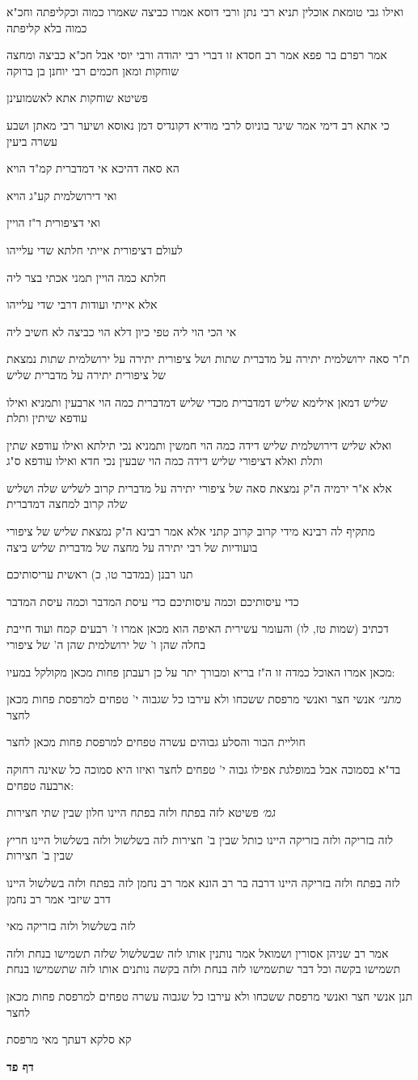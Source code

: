 \documentclass[12pt, openany]{book}
\newcommand{\sethebfont}{
\fontsize{10.5pt}{21.0pt} \selectfont
}
\newcommand{\textblock}[1]{
{\sethebfont #1\\}	
}
\newcommand{\sectname}{}
\newcommand{\newsection}[1]{
	\addcontentsline{toc}{section}{#1}
	\renewcommand{\sectname}{#1}	
	\vspace{-\baselineskip}
	\begin{center}
		\textbf{%
\fontsize{16pt}{16pt}\selectfont
			#1}
	\end{center}
	\vspace{-\baselineskip}
	\nopagebreak
}
\begin{document}
\textblock{ואילו גבי טומאת אוכלין תניא רבי נתן ורבי דוסא אמרו כביצה שאמרו כמוה וכקליפתה וחכ"א כמוה בלא קליפתה}
\textblock{אמר רפרם בר פפא אמר רב חסדא זו דברי רבי יהודה ורבי יוסי אבל חכ"א כביצה ומחצה שוחקות ומאן חכמים רבי יוחנן בן ברוקה}
\textblock{פשיטא שוחקות אתא לאשמועינן}
\textblock{כי אתא רב דימי אמר שיגר בוניוס לרבי מודיא דקונדיס דמן נאוסא ושיער רבי מאתן ושבע עשרה ביעין}
\textblock{הא סאה דהיכא אי דמדברית קמ"ד הויא}
\textblock{ואי דירושלמית קע"ג הויא}
\textblock{ואי דציפורית ר"ז הויין}
\textblock{לעולם דציפורית אייתי חלתא שדי עלייהו}
\textblock{חלתא כמה הויין תמני אכתי בצר ליה}
\textblock{אלא אייתי ועודות דרבי שדי עלייהו}
\textblock{אי הכי הוי ליה טפי כיון דלא הוי כביצה לא חשיב ליה}
\textblock{ת"ר סאה ירושלמית יתירה על מדברית שתות ושל ציפורית יתירה על ירושלמית שתות נמצאת של ציפורית יתירה על מדברית שליש}
\textblock{שליש דמאן אילימא שליש דמדברית מכדי שליש דמדברית כמה הוי ארבעין ותמניא ואילו עודפא שיתין ותלת}
\textblock{ואלא שליש דירושלמית שליש דידה כמה הוי חמשין ותמניא נכי תילתא ואילו עודפא שתין ותלת ואלא דציפורי שליש דידה כמה הוי שבעין נכי חדא ואילו עודפא ס"ג}
\textblock{אלא א"ר ירמיה ה"ק נמצאת סאה של ציפורי יתירה על מדברית קרוב לשליש שלה ושליש שלה קרוב למחצה דמדברית}
\textblock{מתקיף לה רבינא מידי קרוב קרוב קתני אלא אמר רבינא ה"ק נמצאת שליש של ציפורי בועודיות של רבי יתירה על מחצה של מדברית שליש ביצה}
\textblock{תנו רבנן (במדבר טו, כ) ראשית עריסותיכם}
\textblock{כדי עיסותיכם וכמה עיסותיכם כדי עיסת המדבר וכמה עיסת המדבר}
\textblock{דכתיב (שמות טז, לו) והעומר עשירית האיפה הוא מכאן אמרו ז' רבעים קמח ועוד חייבת בחלה שהן ו' של ירושלמית שהן ה' של ציפורי}
\textblock{מכאן אמרו האוכל כמדה זו ה"ז בריא ומבורך יתר על כן רעבתן פחות מכאן מקולקל במעיו:}
\textblock{{\large\emph{מתני׳}} אנשי חצר ואנשי מרפסת ששכחו ולא עירבו כל שגבוה י' טפחים למרפסת פחות מכאן לחצר}
\textblock{חוליית הבור והסלע גבוהים עשרה טפחים למרפסת פחות מכאן לחצר}
\textblock{בד"א בסמוכה אבל במופלגת אפילו גבוה י' טפחים לחצר ואיזו היא סמוכה כל שאינה רחוקה ארבעה טפחים:}
\textblock{{\large\emph{גמ׳}} פשיטא לזה בפתח ולזה בפתח היינו חלון שבין שתי חצירות}
\textblock{לזה בזריקה ולזה בזריקה היינו כותל שבין ב' חצירות לזה בשלשול ולזה בשלשול היינו חריץ שבין ב' חצירות}
\textblock{לזה בפתח ולזה בזריקה היינו דרבה בר רב הונא אמר רב נחמן לזה בפתח ולזה בשלשול היינו דרב שיזבי אמר רב נחמן}
\textblock{לזה בשלשול ולזה בזריקה מאי}
\textblock{אמר רב שניהן אסורין ושמואל אמר נותנין אותו לזה שבשלשול שלזה תשמישו בנחת ולזה תשמישו בקשה וכל דבר שתשמישו לזה בנחת ולזה בקשה נותנים אותו לזה שתשמישו בנחת}
\textblock{תנן אנשי חצר ואנשי מרפסת ששכחו ולא עירבו כל שגבוה עשרה טפחים למרפסת פחות מכאן לחצר}
\textblock{קא סלקא דעתך מאי מרפסת}
\newsection{דף פד}
\end{document}
